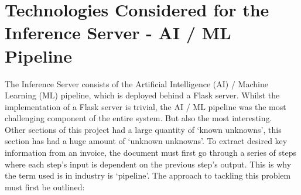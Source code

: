 \section{Technologies Considered for the Inference Server - AI / ML Pipeline}
\label{sec:technologies}
The Inference Server consists of the Artificial Intelligence  (AI) / Machine Learning (ML) pipeline, which is deployed behind a Flask server.
Whilst the implementation of a Flask server is trivial, the AI / ML pipeline was the most challenging component of the entire system. But also
the most interesting.\\
Other sections of this project had a large quantity of `known unknowns', this section has had a huge amount of `unknown unknowns'.
To extract desired key information from an invoice, the document must first go
through a series of steps where each step's input is dependent on the previous step's output. This is why the term used is in industry is
`pipeline'. The approach to tackling this problem must first be outlined:


